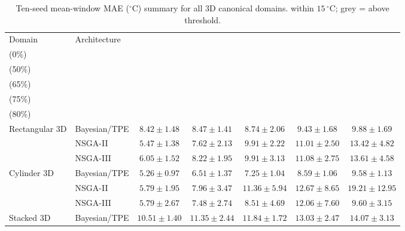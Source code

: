 \begin{table}[H]
\centering\small\setlength{\tabcolsep}{4pt}
\caption{Ten-seed mean-window MAE ($^\circ\mathrm{C}$) summary for all 3D canonical domains.
\phantom{x} within $15\,^\circ\mathrm{C}$;
{\color{gray!60!black}grey} = above threshold.}
\label{tab:summary_3d_mae}
\begin{tabular}{@{}llccccc@{}}
\toprule
Domain & Architecture
  & \makecell{$k{=}1$\\(0\%)} & \makecell{$k{=}2$\\(50\%)} & \makecell{$k{=}3$\\(65\%)} & \makecell{$k{=}4$\\(75\%)} & \makecell{$k{=}5$\\(80\%)} \\
\midrule
\multirow{3}{*}{Rectangular 3D}
  & Bayesian/TPE & \cellcolor{RoyalBlue!20}$8.42\pm1.48$ & \cellcolor{RoyalBlue!20}$8.47\pm1.41$ & \cellcolor{RoyalBlue!20}$8.74\pm2.06$ & \cellcolor{RoyalBlue!20}$9.43\pm1.68$ & \cellcolor{RoyalBlue!20}$9.88\pm1.69$ \\
  & NSGA-II      & \cellcolor{RoyalBlue!20}$5.47\pm1.38$ & \cellcolor{RoyalBlue!20}$7.62\pm2.13$ & \cellcolor{RoyalBlue!20}$9.91\pm2.22$ & \cellcolor{RoyalBlue!20}$11.01\pm2.50$ & \cellcolor{RoyalBlue!20}$13.42\pm4.82$ \\
  & NSGA-III     & \cellcolor{RoyalBlue!20}$6.05\pm1.52$ & \cellcolor{RoyalBlue!20}$8.22\pm1.95$ & \cellcolor{RoyalBlue!20}$9.91\pm3.13$ & \cellcolor{RoyalBlue!20}$11.08\pm2.75$ & \cellcolor{RoyalBlue!20}$13.61\pm4.58$ \\
\midrule
\multirow{3}{*}{Cylinder 3D}
  & Bayesian/TPE & \cellcolor{RoyalBlue!20}$5.26\pm0.97$ & \cellcolor{RoyalBlue!20}$6.51\pm1.37$ & \cellcolor{RoyalBlue!20}$7.25\pm1.04$ & \cellcolor{RoyalBlue!20}$8.59\pm1.06$ & \cellcolor{RoyalBlue!20}$9.58\pm1.13$ \\
  & NSGA-II      & \cellcolor{RoyalBlue!20}$5.79\pm1.95$ & \cellcolor{RoyalBlue!20}$7.96\pm3.47$ & \cellcolor{RoyalBlue!20}$11.36\pm5.94$ & \cellcolor{RoyalBlue!20}$12.67\pm8.65$ & {\color{gray!60!black}$19.21\pm12.95$} \\
  & NSGA-III     & \cellcolor{RoyalBlue!20}$5.79\pm2.67$ & \cellcolor{RoyalBlue!20}$7.48\pm2.74$ & \cellcolor{RoyalBlue!20}$8.51\pm4.69$ & \cellcolor{RoyalBlue!20}$12.06\pm7.60$ & \cellcolor{RoyalBlue!20}$9.60\pm3.15$ \\
\midrule
\multirow{3}{*}{Stacked 3D}
  & Bayesian/TPE & \cellcolor{RoyalBlue!20}$10.51\pm1.40$ & \cellcolor{RoyalBlue!20}$11.35\pm2.44$ & \cellcolor{RoyalBlue!20}$11.84\pm1.72$ & \cellcolor{RoyalBlue!20}$13.03\pm2.47$ & \cellcolor{RoyalBlue!20}$14.07\pm3.13$ \\

\end{tabular}
\end{table}
